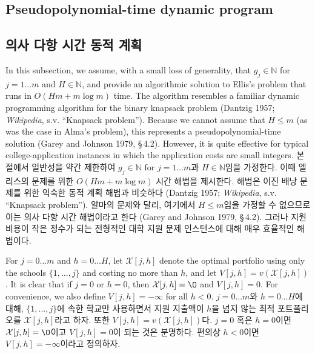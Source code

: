 \documentclass[11pt]{article} %
\theoremstyle{definition}
\theoremstyle{definition}
\begin{document}
\ifen \subsection{Pseudopolynomial-time dynamic program} \else\subsection{의사 다항 시간 동적 계획} \fi
\ifen
In this subsection, we assume, with a small loss of generality, that $g_j \in \mathbb{N}$ for $j = 1\dots m$ and $H \in\mathbb{N}$, and provide an algorithmic solution to Ellis's problem that runs in $O(Hm + m\log m)$ time. The algorithm resembles a familiar dynamic programming algorithm for the binary knapsack problem (Dantzig 1957; \emph{Wikipedia}, s.v. ``Knapsack problem''). Because we cannot assume that $H \leq m$ (as was the case in Alma's problem), this represents a pseudopolynomial-time solution (Garey and Johnson 1979, \S\,4.2). However, it is quite effective for typical college-application instances in which the application costs are small integers.
\else
본 절에서 일반성을 약간 제한하여 $g_j \in \mathbb{N}$ for $j = 1\dots m$과 $H \in\mathbb{N}$임을 가정한다. 이때 엘리스의 문제를 위한 $O(Hm + m\log m)$ 시간 해법을 제시한다. 해법은 이진 배낭 문제를 위한 익숙한 동적 계획 해법과 비슷하다 (Dantzig 1957; \emph{Wikipedia}, s.v. ``Knapsack problem''). 알마의 문제와 달리, 여기에서 $H \leq m$임을 가정할 수 없으므로 이는 의사 다항 시간 해법이라고 한다 (Garey and Johnson 1979, \S\,4.2). 그러나 지원 비용이 작은 정수가 되는 전형적인 대학 지원 문제 인스턴스에 대해 매우 효율적인 해법이다.
\fi

\ifen 
For $j = 0 \dots m$ and $h = 0 \dots H$, let $\mathcal{X}[j, h]$ denote the optimal portfolio using only the schools $\{ 1, \dots, j\}$ and costing no more than $h$, and let $V[j,h] = v(\mathcal{X}[j, h])$.  It is clear that if $j=0$ or $h=0$, then $\mathcal{X}[j, h] = \O$ and $V[j, h] = 0$.  For convenience, we also define $V[j, h] = -\infty$ for all $h < 0$.
\else
$j = 0 \dots m$와 $h = 0 \dots H$에 대해, $\{ 1, \dots, j\}$에 속한 학교만 사용하면서 지원 지출액이 $h$을 넘지 않는 최적 포트폴리오를 $\mathcal{X}[j, h]$라고 하자. 또한  $V[j,h] = v(\mathcal{X}[j, h])$다. $j=0$ 혹은 $h=0$이면 $\mathcal{X}[j, h] = \O$이고 $V[j, h] = 0$이 되는 것은 분명하다. 편의상 $h < 0$이면 $V[j, h] = -\infty$이라고 정의하자.
\fi
\end{document}
